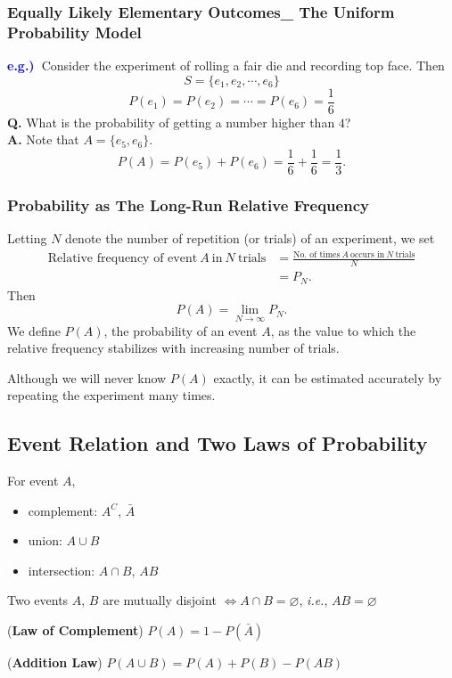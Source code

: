 \documentclass[12pt,a4paper]{article}
\newcommand{\eg}{\textcolor{blue}{\bf e.g.)\ }}
\newcommand{\ie}{\textit{i.e.}}
\begin{document}
\subsubsection{Equally Likely Elementary Outcomes\_ The Uniform Probability Model}
\eg Consider the experiment of rolling a fair die and recording top face. Then \[
S=\{e_1, e_2, \cdots, e_6\}
\] \[
P(e_1)=P(e_2)=\cdots=P(e_6)=\frac{1}{6}
\]
\textbf{Q.} What is the probability of getting a number higher than $4$? \\
\textbf{A.} Note that $A=\{e_5,e_6\}$. \[
P(A)=P(e_5)+P(e_6)=\frac{1}{6}+\frac{1}{6}=\frac{1}{3}.
\]

\subsubsection{Probability as The Long-Run Relative Frequency}
Letting $N$ denote the number of repetition (or trials) of an experiment, we set \begin{align*}
		\text{Relative frequency of event}\ A\ \text{in}\ N\ \text{trials} &= \frac{\text{No. of times}\ A\ \text{occurs in}\ N\ \text{trials}}{N} \\ &= P_N. 
\end{align*}Then \[
	P(A) = \lim\limits_{N\to\infty}P_N.
\] We define $P(A)$, the probability of an event $A$, as the value to which the
relative frequency stabilizes with increasing number of trials. \par
Although we will never know $P(A)$ exactly, it can be estimated accurately by repeating the experiment many times.

\subsection{Event Relation and Two Laws of Probability}
For event $A$, \begin{itemize}
	\item complement: $A^C$, $\bar{A}$
	\item union: $A\cup B$
	\item intersection: $A\cap B$, $AB$
\end{itemize}
Two events $A$, $B$ are mutually disjoint $\iff A\cap B=\varnothing$, \ie, $AB=\varnothing$  
\\
\begin{tcolorbox}[colback=white]
	(\textbf{Law of Complement}) $P(A)=1-P(\bar{A})$
\end{tcolorbox}
\begin{tcolorbox}[colback=white]
	(\textbf{Addition Law}) $P(A\cup B)=P(A)+P(B)-P(AB)$
\end{tcolorbox}
\end{document}

